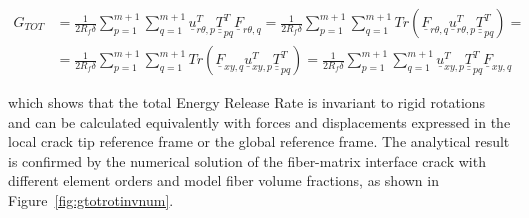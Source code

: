 \documentclass[review]{elsarticle}
\begin{document}
\begin{equation}\label{eq:gtotrotinv}
\begin{split}
G_{TOT} &= \frac{1}{2R_{f}\delta}\sum_{p=1}^{m+1}\sum_{q=1}^{m+1}\underline{u}_{r\theta,p}^{T}\underline{\underline{T}}_{pq}^{T}\underline{F}_{r\theta,q}=\frac{1}{2R_{f}\delta}\sum_{p=1}^{m+1}\sum_{q=1}^{m+1}Tr\left(\underline{F}_{r\theta,q}\underline{u}_{r\theta,p}^{T}\underline{\underline{T}}_{pq}^{T}\right)=\\
&=\frac{1}{2R_{f}\delta}\sum_{p=1}^{m+1}\sum_{q=1}^{m+1}Tr\left(\underline{F}_{xy,q}\underline{u}_{xy,p}^{T}\underline{\underline{T}}_{pq}^{T}\right)=\frac{1}{2R_{f}\delta}\sum_{p=1}^{m+1}\sum_{q=1}^{m+1}\underline{u}_{xy,p}^{T}\underline{\underline{T}}_{pq}^{T}\underline{F}_{xy,q}
\end{split}
\end{equation}

which shows that the total Energy Release Rate is invariant to rigid rotations and can be calculated equivalently with forces and displacements expressed in the local crack tip reference frame or the global reference frame. The analytical result is confirmed by the numerical solution of the fiber-matrix interface crack with different element orders and model fiber volume fractions, as shown in Figure~\ref{fig:gtotrotinvnum}.
\end{document}
